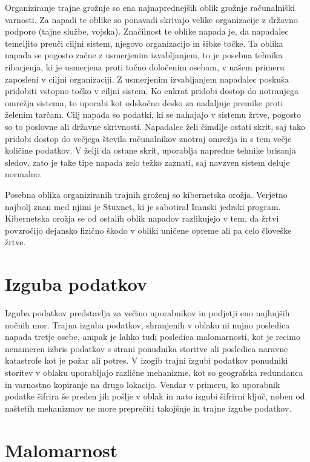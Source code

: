 \documentclass[12pt,a4paper,openany,tikz]{book}
\theoremstyle{plain}
\theoremstyle{definition}
\begin{document}
Organiziranje trajne grožnje so ena najnaprednejših oblik grožnje računalniški varnosti. Za napadi te oblike so ponavadi skrivajo velike organizacije z državno podporo (tajne službe, vojska). Značilnost te oblike napada je, da napadalec temeljito preuči ciljni sistem, njegovo organizacijo in šibke točke. Ta oblika napada se pogosto začne z usmerjenim izvabljanjem, to je posebna tehnika ribarjenja, ki je usmerjena proti točno določenim osebam, v našem primeru zaposleni v ciljni organizaciji. Z usmerjenim izvabljanjem napadalec poskuša pridobiti vstopno točko v ciljni sistem. Ko enkrat pridobi dostop do notranjega omrežja sistema, to uporabi kot odskočno desko za nadaljnje premike proti želenim tarčam. Cilj napada so podatki, ki se nahajajo v sistemu žrtve, pogosto so to poslovne ali državne skrivnosti. Napadalec želi čimdlje ostati skrit, saj tako pridobi dostop do večjega števila računalnikov znotraj omrežja in s tem večje količine podatkov. V želji da ostane skrit, uporablja napredne tehnike brisanja sledov, zato je take tipe napada zelo težko zaznati, saj navzven sistem deluje normalno.

Posebna oblika organiziranih trajnih groženj so kibernetska orožja. Verjetno najbolj znan med njimi je Stuxnet, ki je sabotiral Iranski jedrski program. Kibernetska orožja se od ostalih oblik napadov razlikujejo v tem, da žrtvi povzročijo dejansko fizično škodo v obliki uničene opreme ali pa celo človeške žrtve.

\section{Izguba podatkov}
\label{sub:Izguba podatkov}

Izguba podatkov predstavlja za večino uporabnikov in podjetji eno najhujših nočnih mor. Trajna izguba podatkov, shranjenih v oblaku ni nujno posledica napada tretje osebe, ampak je lahko tudi posledica malomarnosti, kot je recimo nenameren izbris podatkov s strani ponudnika storitve ali posledica naravne katastrofe kot je požar ali potres. V izogib trajni izgubi podatkov ponudniki storitev v oblaku uporabljajo različne mehanizme, kot so geografska redundanca in varnostno kopiranje na drugo lokacijo. Vendar v primeru, ko uporabnik podatke šifrira še preden jih pošlje v oblak in nato izgubi šifrirni ključ, noben od naštetih mehanizmov ne more preprečiti takojšnje in trajne izgube podatkov.

\section{Malomarnost}
\label{sub:Malomarnost}
\end{document}
